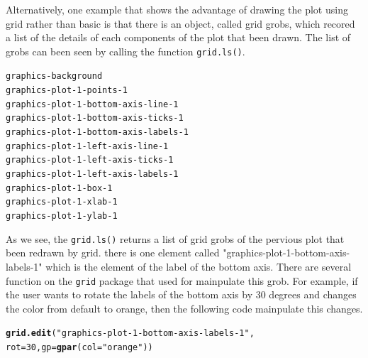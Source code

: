 \documentclass[a4paper,10pt]{article}\usepackage[]{graphicx}\usepackage[]{color}
\makeatletter
\newcommand{\hlnum}[1]{\textcolor[rgb]{0.686,0.059,0.569}{#1}}%
\newcommand{\hlstr}[1]{\textcolor[rgb]{0.192,0.494,0.8}{#1}}%
\newcommand{\hlopt}[1]{\textcolor[rgb]{0,0,0}{#1}}%
\newcommand{\hlstd}[1]{\textcolor[rgb]{0.345,0.345,0.345}{#1}}%
\newcommand{\hlkwc}[1]{\textcolor[rgb]{0.333,0.667,0.333}{#1}}%
\newcommand{\hlkwd}[1]{\textcolor[rgb]{0.737,0.353,0.396}{\textbf{#1}}}%
\newenvironment{kframe}{%
 \def\at@end@of@kframe{}%
 \ifinner\ifhmode%
  \def\at@end@of@kframe{\end{minipage}}%
  \begin{minipage}{\columnwidth}%
 \fi\fi%
 \def\FrameCommand##1{\hskip\@totalleftmargin \hskip-\fboxsep
 \colorbox{shadecolor}{##1}\hskip-\fboxsep
     \hskip-\linewidth \hskip-\@totalleftmargin \hskip\columnwidth}%
 \MakeFramed {\advance\hsize-\width
   \@totalleftmargin\z@ \linewidth\hsize
   \@setminipage}}%
 {\par\unskip\endMakeFramed%
 \at@end@of@kframe}
\newenvironment{knitrout}{}{} %
\makeatother
\begin{document}
Alternatively, one example that shows the advantage of drawing the plot using grid rather than basic is that there is an object, called grid grobs, which recored a list of the details of each components of the plot that been drawn. The list of grobs can been seen by calling the function \texttt{grid.ls()}. \\
\begin{knitrout}
\color{fgcolor}\begin{kframe}
\begin{alltt}
\hlstd{graphics}\hlopt{-}\hlstd{background}
\hlstd{graphics}\hlopt{-}\hlstd{plot}\hlopt{-}\hlnum{1}\hlopt{-}\hlstd{points}\hlopt{-}\hlnum{1}
\hlstd{graphics}\hlopt{-}\hlstd{plot}\hlopt{-}\hlnum{1}\hlopt{-}\hlstd{bottom}\hlopt{-}\hlstd{axis}\hlopt{-}\hlstd{line}\hlopt{-}\hlnum{1}
\hlstd{graphics}\hlopt{-}\hlstd{plot}\hlopt{-}\hlnum{1}\hlopt{-}\hlstd{bottom}\hlopt{-}\hlstd{axis}\hlopt{-}\hlstd{ticks}\hlopt{-}\hlnum{1}
\hlstd{graphics}\hlopt{-}\hlstd{plot}\hlopt{-}\hlnum{1}\hlopt{-}\hlstd{bottom}\hlopt{-}\hlstd{axis}\hlopt{-}\hlstd{labels}\hlopt{-}\hlnum{1}
\hlstd{graphics}\hlopt{-}\hlstd{plot}\hlopt{-}\hlnum{1}\hlopt{-}\hlstd{left}\hlopt{-}\hlstd{axis}\hlopt{-}\hlstd{line}\hlopt{-}\hlnum{1}
\hlstd{graphics}\hlopt{-}\hlstd{plot}\hlopt{-}\hlnum{1}\hlopt{-}\hlstd{left}\hlopt{-}\hlstd{axis}\hlopt{-}\hlstd{ticks}\hlopt{-}\hlnum{1}
\hlstd{graphics}\hlopt{-}\hlstd{plot}\hlopt{-}\hlnum{1}\hlopt{-}\hlstd{left}\hlopt{-}\hlstd{axis}\hlopt{-}\hlstd{labels}\hlopt{-}\hlnum{1}
\hlstd{graphics}\hlopt{-}\hlstd{plot}\hlopt{-}\hlnum{1}\hlopt{-}\hlstd{box}\hlopt{-}\hlnum{1}
\hlstd{graphics}\hlopt{-}\hlstd{plot}\hlopt{-}\hlnum{1}\hlopt{-}\hlstd{xlab}\hlopt{-}\hlnum{1}
\hlstd{graphics}\hlopt{-}\hlstd{plot}\hlopt{-}\hlnum{1}\hlopt{-}\hlstd{ylab}\hlopt{-}\hlnum{1}
\end{alltt}
\end{kframe}
\end{knitrout}

As we see, the \texttt{grid.ls()} returns a list of grid grobs of the pervious plot that been redrawn by grid. there is one element called "graphics-plot-1-bottom-axis-labels-1" which is the element of the label of the bottom axis. There are several function on the \texttt{grid} package that used for mainpulate this grob. For example, if the user wants to rotate the labels of the bottom axis by 30 degrees and changes the color from default to orange, then the following code mainpulate this changes.

\begin{knitrout}
\color{fgcolor}\begin{kframe}
\begin{alltt}
\hlkwd{grid.edit}\hlstd{(}\hlstr{"graphics-plot-1-bottom-axis-labels-1"}\hlstd{,}
          \hlkwc{rot}\hlstd{=}\hlnum{30}\hlstd{,} \hlkwc{gp}\hlstd{=}\hlkwd{gpar}\hlstd{(}\hlkwc{col}\hlstd{=}\hlstr{"orange"}\hlstd{))}
\end{alltt}
\end{kframe}
\end{knitrout}
\end{document}
